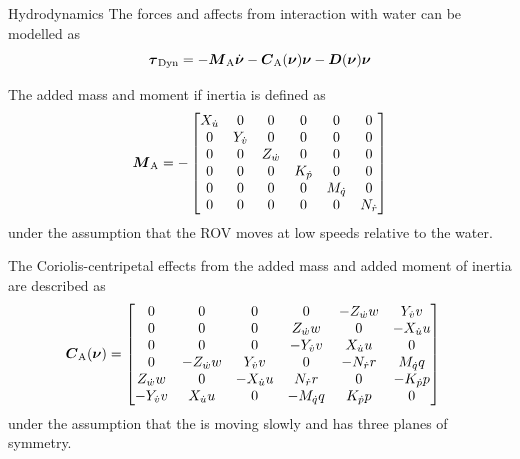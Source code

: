 \documentclass[11pt,aspectratio=169]{beamer}
\begin{document}
\begin{frame}{Hydrodynamics}
The forces and affects from interaction with water can be modelled as
\begin{equation} \label{eq:dyn}
 \boldsymbol{\tau}_\text{{Dyn}}=-\boldsymbol{M}_{\text{A}} \dot{\boldsymbol{\nu}} -\boldsymbol{C}_{\text{A}}(\boldsymbol{\nu})\boldsymbol{\nu} - \boldsymbol{D}(\boldsymbol{\nu})\boldsymbol{\nu}  
\end{equation} 


The added mass and moment if inertia is defined as
\begin{equation}
\boldsymbol{M}_\text{A} =
-\begin{bmatrix}
    X_{\dot{u}} & 0 & 0 & 0 & 0 & 0 \\
    0 & Y_{\dot{v}} & 0 & 0 & 0 & 0 \\
    0 & 0 & Z_{\dot{w}} & 0 & 0 & 0 \\
    0 & 0 & 0 & K_{\dot{p}}& 0 & 0 \\
    0 & 0 & 0 & 0 & M_{\dot{q}} & 0 \\
    0 & 0 & 0 & 0 & 0 & N_{\dot{r}} \\
    \end{bmatrix}
\end{equation}
under the assumption that the ROV moves at low speeds relative to the water.
\end{frame}

\begin{frame}
The Coriolis-centripetal effects from the added mass and added moment of inertia are described as
\begin{align}
    \boldsymbol{C}_\text{A}(\boldsymbol{\nu}) &= 
    \begin{bmatrix}
    0 & 0 & 0 & 0 & -Z_{\dot{w}} w & Y_{\dot{v}} v \\
    0 & 0 & 0 & Z_{\dot{w}} w & 0 & -X_{\dot{u}} u \\
    0 & 0 & 0 & -Y_{\dot{v}} v & X_{\dot{u}} u & 0 \\
    0 & -Z_{\dot{w}} w & Y_{\dot{v}} v & 0 & -N_{\dot{r}} r & M_{\dot{q}} q \\
    Z_{\dot{w}} w & 0 & -X_{\dot{u}} u & N_{\dot{r}} r & 0 & -K_{\dot{p}} p \\
    -Y_{\dot{v}} v & X_{\dot{u}} u & 0 & - M_{\dot{q}} q & K_{\dot{p}} p & 0 \\
    \end{bmatrix}
\end{align}
under the assumption that the \abbrROV is moving slowly and has three planes of symmetry.
\end{frame}
\end{document}
